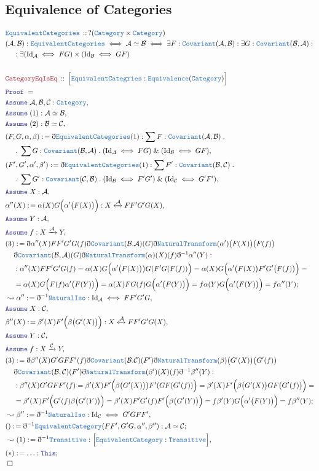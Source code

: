 \documentclass[12pt]{scrartcl}
\newcommand{\TYPE}[1]{\textcolor{NavyBlue}{\mathtt{#1}}}
\newcommand{\LOGIC}[1]{\textcolor{Blue}{\mathtt{#1}}}
\newcommand{\THM}[1]{\textcolor{Maroon}{\mathtt{#1}}}
\renewcommand{\.}{\; . \;}
\newcommand{\de}{: \kern 0.1pc =}
\newcommand{\Theorem}[2]{& \THM{#1} \, :: \, #2 \\ & \Proof = \\ }
\newcommand{\DeclareType}[2]{& \TYPE{#1} \, :: \, #2 \\}
\newcommand{\DefineNamedType}[4]{& #1 : \TYPE{#2} \iff #3 \iff #4 \\}
\newcommand{\NewLine}{\\ & \kern 1pc}
\newcommand{\Page}[1]{ \begin{align*} #1 \end{align*}   }
\newcommand{ \bd }{ \ByDef }
\renewcommand{\And}{\; \& \;}
\newcommand{\Cat}{\TYPE{Category}}
\newcommand{\ToIso}{\xleftrightarrow}
\newcommand{\Arrow}{\xrightarrow}
\newcommand{\Say}[3]{& #1 \de #2 : #3, \\}
\newcommand{\Conclude}[3]{& #1 \de #2 : #3; \\}
\newcommand{\Derive}[3]{& \leadsto #1 \de #2 : #3, \\}
\newcommand{\Assume}[2]{& \LOGIC{Assume} \; #1 : #2, \\}
\newcommand{\QED}{\; \square}
\newcommand{\EndProof}{& \QED \\}
\newcommand{\ByDef}{\eth}
\newcommand{\Proof}{\LOGIC{Proof} \; }
\newcommand{\Cov}{\TYPE{Covariant}}
\newcommand{\NT}{\TYPE{NaturalTransform}}
\newcommand{\C}{\mathcal{C}}
\newcommand{\A}{\mathcal{A}}
\newcommand{\B}{\mathcal{B}}
\begin{document}
\subsection{Equivalence of Categories}
\Page{
	\DeclareType{EquivalentCategories}{?(\Cat \times \Cat)}
	\DefineNamedType{(\mathcal{A},\mathcal{B})}{EquivalentCategories}{\mathcal{A} \simeq \mathcal{B}}
	{ \exists F : \Cov(\mathcal{A},\mathcal{B}) : \exists G : \Cov(\mathcal{B},\mathcal{A}) :
	  \NewLine :
	  \exists  (\mathrm{Id}_{\mathcal{A}} \iff FG) \times (\mathrm{Id}_{\mathcal{B}} \iff GF) }
	\\
      \Theorem{CategoryEqIsEq}{ \Big[\TYPE{EquivalentCategries} : \TYPE{Equivalence}(\Cat)\Big]}
      \Assume{\A,\B,\C}{\Cat}
      \Assume{(1)}{\A \simeq \B}
      \Assume{(2)}{\B \simeq \C}
      \Say{(F,G,\alpha,\beta)}{ \bd \TYPE{EquivalentCategories}(1) }{\sum F : \Cov(\A,\B) \.
        \NewLine \.
      	\sum G : \Cov(\B,\A) \. (\mathrm{Id}_{\A} \iff FG) \And (\mathrm{Id}_{\B} \iff GF)}
      \Say{(F',G',\alpha',\beta')}{ \bd \TYPE{EquivalentCategories}(1) }{\sum F' : \Cov(\B,\C) \.
        \NewLine \.
      	\sum G' : \Cov(\C,\B) \. (\mathrm{Id}_{\B} \iff F'G') \And (\mathrm{Id}_{\C} \iff G'F')}
     \Assume{X}{\A}
     \Say{\alpha''(X)}{  \alpha(X)G\Big(\alpha'\big(F(X)\big)\Big)  }{  X \ToIso{\A} FF'G'G(X) }
     \Assume{Y}{\A}
     \Assume{f}{X \Arrow{\A} Y} 
     \Conclude{(3)}{ \bd \alpha''(X)  FF'G'G(f) \bd \Cov(\B.\A)(G)\bd \NT(\alpha')\big(F(X)\big)\big(F(f)\big) 
     	\NewLine \bd \Cov(\B,\A)(G) \bd \NT(\alpha)(X)(f) \bd^{-1} \alpha''(Y)
     }{   \NewLine :
     	\alpha''(X) FF'G'G(f) =  \alpha(X) G\Big( \alpha'\big(F(X)\big)\big) G( F'G(F(f)) \Big) 
        = \alpha(X) G\Big(   \alpha'\big(F(X)\big) F'G'\big(F(f)\big)  \Big) = 
	\NewLine =  \alpha(X) G \Big(  F(f) \alpha'\big(F(Y)\big)   \Big) = 
	\alpha(X) FG(f) G\Big(\alpha'\big(F(Y)\big)\Big)  = f \alpha(Y) G\Big(\alpha'\big(F(Y)\big)\Big) = f \alpha''(Y) 
     }
    \Derive{\alpha''}{\bd^{-1}\TYPE{NaturalIso}}{ \mathrm{Id}_{\mathcal{A}} \iff FF'G'G    }
     \Assume{X}{\C}
     \Say{\beta''(X)}{  \beta'(X)F'\Big(\beta \big(G'(X)\big)\Big)  }{  X \ToIso{\A} FF'G'G(X) }
     \Assume{Y}{\C}
     \Assume{f}{X \Arrow{\C} Y} 
     \Conclude{(3)}{ \bd \beta''(X)  G'GFF'(f) \bd \Cov(\B.\C)(F')\bd \NT(\beta)\big(G'(X)\big)\big(G'(f)\big) 
     	\NewLine \bd \Cov(\B,\C)(F') \bd \NT(\beta')(X)(f) \bd^{-1} \beta''(Y)
     }{   \NewLine :
     	\beta''(X) G'GFF'(f) =  \beta'(X) F'\Big( \beta\big(G'(X)\big)\big) F'( GF(G'(f)) \Big) 
        = \beta'(X) F'\Big(   \beta \big(G'(X)\big) GF\big(G'(f)\big)  \Big) = 
	\NewLine =  \beta'(X) F' \Big(  G'(f) \beta\big(G'(Y)\big)   \Big) = 
	\beta'(X) F'G'(f) F'\Big(\beta \big(G'(Y)\big)\Big)  = f \beta' (Y) G\Big(\alpha'\big(F(Y)\big)\Big) = f \beta''(Y) 
     }
    \Derive{\beta''}{\bd^{-1}\TYPE{NaturalIso}}{ \mathrm{Id}_{\C} \iff G'GFF' }
    \Conclude{()}{\bd^{-1} \TYPE{EquivalentCategory}(FF',G'G,\alpha'',\beta'')}{ \A \simeq \C}
    \Derive{(1)}{\bd^{-1} \TYPE{Transitive}}{ \Big[ \TYPE{EquivalentCategory} : \TYPE{Transitive} \Big] }
    \Conclude{(*)}{\ldots}{\LOGIC{This}}
    \EndProof
}
\end{document}
